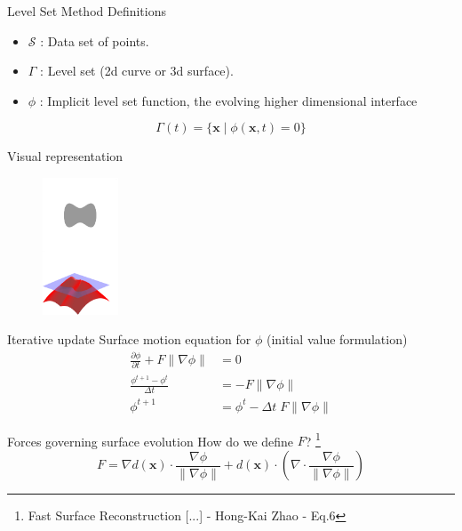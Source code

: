 \documentclass{beamer}
\begin{document}
\begin{frame}{Level Set Method}
Definitions
\begin{itemize}
\item $\mathcal{S}$ : Data set of points.
\item $\Gamma$ : Level set (2d curve or 3d surface).
\item $\phi$ : Implicit level set function, the evolving higher dimensional interface 
\end{itemize}

\[
\Gamma(t) = \{\mathbf{x} \; | \; \phi(\mathbf{x},t) = 0\}
\]
\end{frame}
\begin{frame}{Visual representation}
\begin{figure}[H]
\centering
\includegraphics[width=0.2\textwidth]{img/Signed_distance2.png}
\end{figure}
\end{frame}
\begin{frame}{Iterative update}
Surface motion equation for $\phi$ (initial value formulation)
\begin{align}
    \frac{\partial \phi}{\partial t} + F \|\nabla \phi\| &= 0 \\
    \frac{\phi^{t+1} - \phi^{t}}{\Delta t} &=  -F \|\nabla \phi\| \\
    \phi^{t+1} &= \phi^{t} - \Delta t \; F \|\nabla \phi\| 
\end{align}
\end{frame}

\begin{frame}{Forces governing surface evolution}
How do we define $F$? \footnote{Fast Surface Reconstruction [...] - Hong-Kai Zhao - Eq.6}
\[
F = \nabla d(\mathbf{x}) \cdot \frac{\nabla \phi}{\| \nabla \phi \|}
+ d(\mathbf{x}) \cdot (\nabla \cdot \frac{\nabla \phi}{\| \nabla \phi \|} )
\]
\end{frame}
\end{document}
